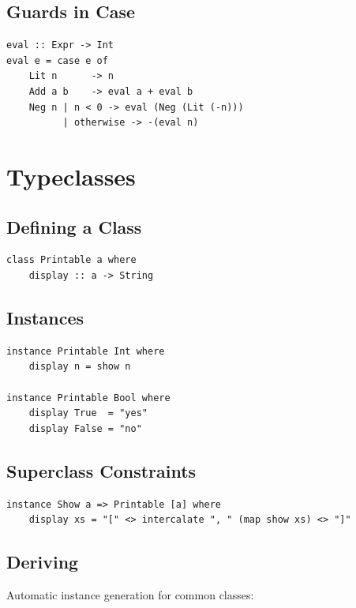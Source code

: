\documentclass[11pt,a4paper]{article}
\begin{document}
\subsection{Guards in Case}

\begin{lstlisting}
eval :: Expr -> Int
eval e = case e of
    Lit n      -> n
    Add a b    -> eval a + eval b
    Neg n | n < 0 -> eval (Neg (Lit (-n)))
          | otherwise -> -(eval n)
\end{lstlisting}

\section{Typeclasses}

\subsection{Defining a Class}

\begin{lstlisting}
class Printable a where
    display :: a -> String
\end{lstlisting}

\subsection{Instances}

\begin{lstlisting}
instance Printable Int where
    display n = show n

instance Printable Bool where
    display True  = "yes"
    display False = "no"
\end{lstlisting}

\subsection{Superclass Constraints}

\begin{lstlisting}
instance Show a => Printable [a] where
    display xs = "[" <> intercalate ", " (map show xs) <> "]"
\end{lstlisting}

\subsection{Deriving}

Automatic instance generation for common classes:
\end{document}
